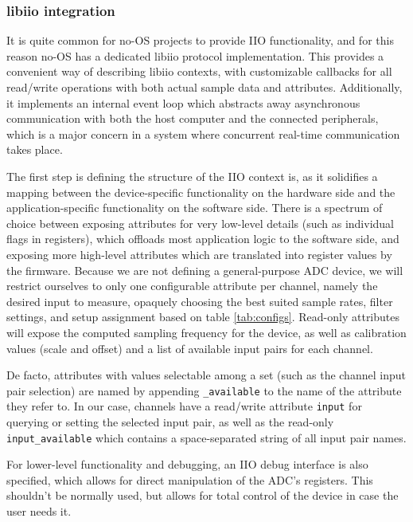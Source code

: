 \documentclass{thesis}
\begin{document}
\subsubsection{libiio integration}

It is quite common for no-OS projects to provide IIO functionality, and for this reason no-OS has a dedicated libiio protocol implementation. This provides a convenient way of describing libiio contexts, with customizable callbacks for all read/write operations with both actual sample data and attributes. Additionally, it implements an internal event loop which abstracts away asynchronous communication with both the host computer and the connected peripherals, which is a major concern in a system where concurrent real-time communication takes place.

The first step is defining the structure of the IIO context is, as it solidifies a mapping between the device-specific functionality on the hardware side and the application-specific functionality on the software side. There is a spectrum of choice between exposing attributes for very low-level details (such as individual flags in registers), which offloads most application logic to the software side, and exposing more high-level attributes which are translated into register values by the firmware. Because we are not defining a general-purpose ADC device, we will restrict ourselves to only one configurable attribute per channel, namely the desired input to measure, opaquely choosing the best suited sample rates, filter settings, and setup assignment based on table \ref{tab:configs}. Read-only attributes will expose the computed sampling frequency for the device, as well as calibration values (scale and offset) and a list of available input pairs for each channel.

De facto, attributes with values selectable among a set (such as the channel input pair selection) are named by appending \texttt{\_available} to the name of the attribute they refer to. In our case, channels have a read/write attribute \texttt{input} for querying or setting the selected input pair, as well as the read-only \texttt{input\_available} which contains a space-separated string of all input pair names.

For lower-level functionality and debugging, an IIO debug interface is also specified, which allows for direct manipulation of the ADC's registers. This shouldn't be normally used, but allows for total control of the device in case the user needs it.
\end{document}
